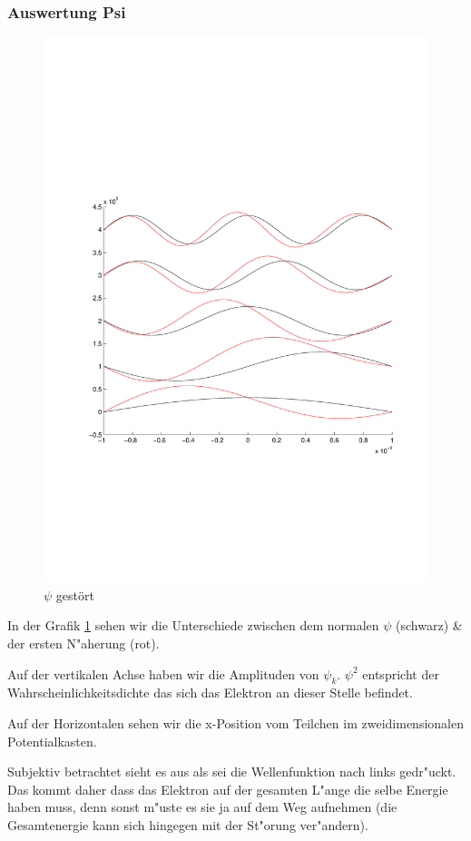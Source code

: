 \begin{refsection}
\subsubsection{Auswertung Psi}

\begin{figure}
 \centering
 \includegraphics[width=12cm,clip=true,trim=2cm 7cm 1cm 8cm]{efeld/Psi_gestoert.pdf}
 \caption{$\psi$ gest\"ort}
 \label{abb:efeld_psi_gestoert}
\end{figure}

In der Grafik \ref{abb:efeld_psi_gestoert} sehen wir die Unterschiede zwischen dem normalen $\psi$ (schwarz) \& der ersten N"aherung (rot).

Auf der vertikalen Achse haben wir die Amplituden von $\psi_k$.
$\psi^2$ entspricht der Wahrscheinlichkeitsdichte das sich das Elektron an dieser Stelle befindet.

Auf der Horizontalen sehen wir die x-Position vom Teilchen im zweidimensionalen Potentialkasten.

Subjektiv betrachtet sieht es aus als sei die Wellenfunktion nach links gedr"uckt.
Das kommt daher dass das Elektron auf der gesamten L"ange die selbe Energie haben muss,
denn sonst m"uste es sie ja auf dem Weg aufnehmen (die Gesamtenergie kann sich hingegen mit der St"orung ver"andern).


\end{refsection}
